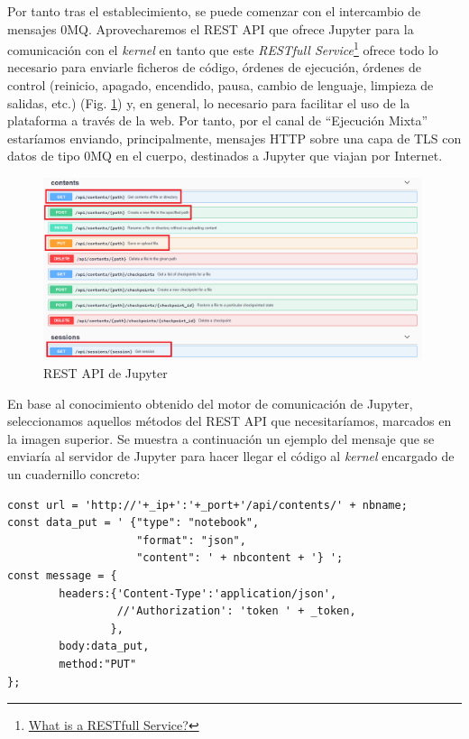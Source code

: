 Por tanto tras el establecimiento, se puede comenzar con el intercambio de mensajes 0MQ. Aprovecharemos el REST API que ofrece Jupyter para la comunicación con el \textit{kernel} en tanto que este \textit{RESTfull Service}\footnote{\href{https://docs.oracle.com/javaee/6/tutorial/doc/gijqy.html}{What is a RESTfull Service?}} ofrece todo lo necesario para enviarle ficheros de código, órdenes de ejecución, órdenes de control (reinicio, apagado, encendido, pausa, cambio de lenguaje, limpieza de salidas, etc.) (Fig. \ref{jupyter_rest_api}) y, en general, lo necesario para facilitar el uso de la plataforma a través de la web. Por tanto, por el canal de ``Ejecución Mixta'' estaríamos enviando, principalmente, mensajes HTTP sobre una capa de TLS con datos de tipo 0MQ en el cuerpo, destinados a Jupyter que viajan por Internet.

\begin{figure}[!ht]  \centering\noindent
    \includegraphics[width=0.99\textwidth]{figures/jupyter_rest_api.png}
    \caption{REST API de Jupyter}
    \label{jupyter_rest_api}
\end{figure}

En base al conocimiento obtenido del motor de comunicación de Jupyter, seleccionamos aquellos métodos del REST API que necesitaríamos, marcados en la imagen superior. Se muestra a continuación un ejemplo del mensaje que se enviaría al servidor de Jupyter para hacer llegar el código al \textit{kernel} encargado de un cuadernillo concreto:

\begin{minipage}{\linewidth}
\begin{lstlisting}[caption=Formato de Mensajes de ``Ejecución Mixta'']
const url = 'http://'+_ip+':'+_port+'/api/contents/' + nbname;
const data_put = ' {"type": "notebook",
                    "format": "json",
                    "content": ' + nbcontent + '} ';
const message = {
        headers:{'Content-Type':'application/json',
                 //'Authorization': 'token ' + _token,
                },
        body:data_put,
        method:"PUT"
};
\end{lstlisting}
\end{minipage}

